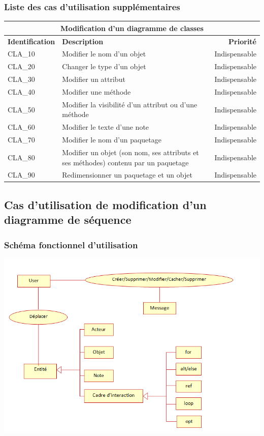 \documentclass[hidelinks, 10pt,a4paper]{article}
\begin{document}
\subsubsection{Liste des cas d’utilisation supplémentaires}
\begin{center}
    \begin{tabular}{|l|p{8cm}|r|}
        \hline\multicolumn{3}{|c|}{Modification d’un diagramme de classes} \\\hline
        {\textbf{Identification}} & {\textbf{Description}} & {\textbf{Priorité}} \\\hline
        {CLA\_10} & {Modifier le nom d’un objet} & {Indispensable} \\\hline
        {CLA\_20} & {Changer le type d’un objet} & {Indispensable} \\\hline
        {CLA\_30} & {Modifier un attribut} & {Indispensable} \\\hline
        {CLA\_40} & {Modifier une méthode} & {Indispensable} \\\hline
        {CLA\_50} & {Modifier la visibilité d’un attribut ou d’une méthode} & {Indispensable} \\\hline
        {CLA\_60} & {Modifier le texte d’une note} & {Indispensable} \\\hline
        {CLA\_70} & {Modifier le nom d’un paquetage} & {Indispensable} \\\hline
        {CLA\_80} & {Modifier un objet (son nom, ses attributs et ses méthodes) contenu par un paquetage} & {Indispensable} \\\hline
        {CLA\_90} & {Redimensionner un paquetage et un objet} & {Indispensable} \\\hline
    \end{tabular}
\end{center}


\subsection{Cas d’utilisation de modification d’un diagramme de séquence}
\subsubsection{Schéma fonctionnel d’utilisation}
\begin{center}
    \includegraphics[width=14cm]{imgSTB/E-R-Sequence.png}
\end{center}
\end{document}
